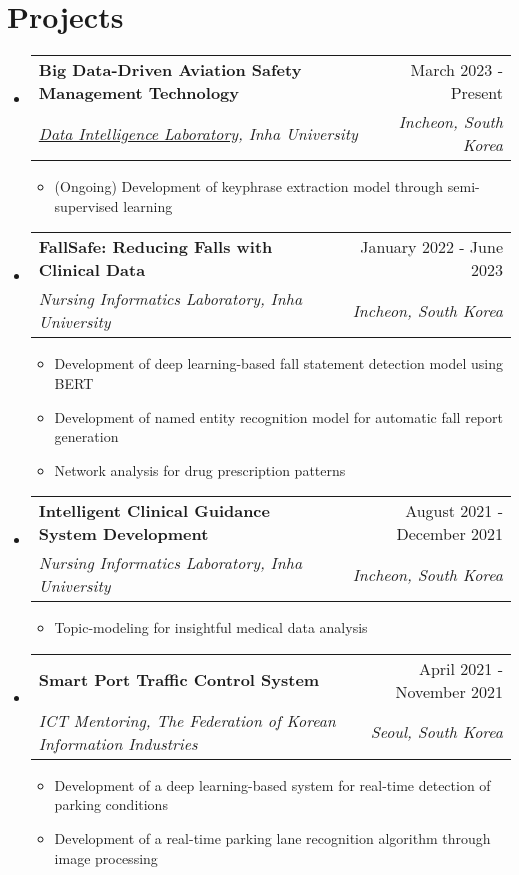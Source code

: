 \documentclass[letterpaper,11pt]{article}
\makeatletter
\newcommand{\resumeSubheading}[4]{
  \vspace{-1pt}\item
    \begin{tabular*}{0.97\textwidth}{l@{\extracolsep{\fill}}r}
      #1 & #2 \\
      \textit{\small#3} & \textit{\small #4} \\
    \end{tabular*}\vspace{-5pt}
}
\makeatother
\begin{document}
    \section{Projects}
    \begin{itemize}[leftmargin=*,label=]
        \resumeSubheading
        {\textbf{Big Data-Driven Aviation Safety Management Technology}}{March 2023 - Present}
            {\href{http://dilab.inha.ac.kr/}{Data Intelligence Laboratory}, Inha University}{Incheon, South Korea}
            \begin{itemize}[label=\bullet]
                \item{(Ongoing) Development of keyphrase extraction model through semi-supervised learning}
            \end{itemize}
        \resumeSubheading
        {\textbf{FallSafe: Reducing Falls with Clinical Data}}{January 2022 - June 2023}
            {Nursing Informatics Laboratory, Inha University}{Incheon, South Korea}
            \begin{itemize}[label=\bullet]
                \item{Development of deep learning-based fall statement detection model using BERT}
                \item{Development of named entity recognition model for automatic fall report generation}
                \item{Network analysis for drug prescription patterns}
            \end{itemize}
        \resumeSubheading
        {\textbf{Intelligent Clinical Guidance System Development}}{August 2021 - December 2021}
            {Nursing Informatics Laboratory, Inha University}{Incheon, South Korea}
            \begin{itemize}[label=\bullet]
                \item{Topic-modeling for insightful medical data analysis}
            \end{itemize}
        \resumeSubheading
        {\textbf{Smart Port Traffic Control System}}{April 2021 - November 2021}
            {ICT Mentoring, The Federation of Korean Information Industries}{Seoul, South Korea}
            \begin{itemize}[label=\bullet]
                \item{Development of a deep learning-based system for real-time detection of parking conditions}
                \item{Development of a real-time parking lane recognition algorithm through image processing}
            \end{itemize}
    \end{itemize}
    
\end{document}

